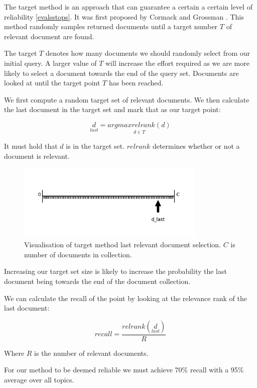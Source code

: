 The target method is an approach that can guarantee a certain a certain level of reliability \ref{evalsstops}. It was first proposed by Cormack and Grossman \cite{Cormack2016}. This method randomly samples returned documents until a target number $T$ of relevant document are found.

The target $T$ denotes how many documents we should randomly select from our initial query. A larger value of $T$ will increase the effort required as we are more likely to select a document towards the end of the query set. Documents are looked at until the target point $T$ has been reached.

We first compute a random target set of relevant documents. We then calculate the last document in the target set and mark that as our target point:

\begin{equation}
	  \underset{last}{d} = \underset{d \in{T}}{argmax relrank(d)}
\end{equation}

It must hold that $d$ is in the target set. $relrank$ determines whether or not a document is relevant.

\begin{figure}[H]
\center
\includegraphics[width=9cm]{figures/target_method.png}
\caption{Visualisation of target method last relevant document selection. $C$ is number of documents in collection.}
\end{figure}

Increasing our target set size is likely to increase the probability the last document being towards the end of the document collection.

We can calculate the recall of the point by looking at the relevance rank of the last document:

\begin{equation}
	  recall = \frac{relrank(\underset{last}{d})}{R}
\end{equation}

Where $R$ is the number of relevant documents.


For our method to be deemed reliable we must achieve 70\% recall with a 95\% average over all topics.

